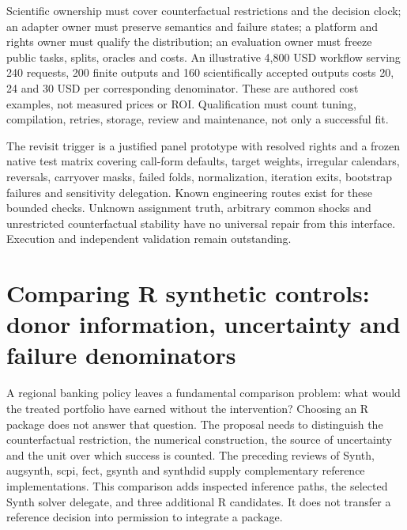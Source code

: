 Scientific ownership must cover counterfactual restrictions and the
decision clock; an adapter owner must preserve semantics and failure
states; a platform and rights owner must qualify the distribution; an
evaluation owner must freeze public tasks, splits, oracles and costs.
An illustrative 4,800 USD workflow serving 240 requests, 200 finite
outputs and 160 scientifically accepted outputs costs 20, 24 and 30 USD
per corresponding denominator. These are authored cost examples, not
measured prices or ROI. Qualification must count tuning, compilation,
retries, storage, review and maintenance, not only a successful fit.
\citep{exec24_fect_choice}

The revisit trigger is a justified panel prototype with resolved rights
and a frozen native test matrix covering call-form defaults, target
weights, irregular calendars, reversals, carryover masks, failed folds,
normalization, iteration exits, bootstrap failures and sensitivity
delegation. Known engineering routes exist for these bounded checks.
Unknown assignment truth, arbitrary common shocks and unrestricted
counterfactual stability have no universal repair from this interface.
Execution and independent validation remain outstanding.
\citep{exec24_fect_choice}


\section{Comparing R synthetic controls: donor information, uncertainty and failure denominators}
\label{sec:exec25-synthetic-r-coverage}

A regional banking policy leaves a fundamental comparison problem: what would
the treated portfolio have earned without the intervention? Choosing an R
package does not answer that question. The proposal needs to distinguish the
counterfactual restriction, the numerical construction, the source of
uncertainty and the unit over which success is counted. The preceding reviews
of Synth, augsynth, scpi, fect, gsynth and synthdid supply complementary
reference implementations. This comparison adds inspected inference paths,
the selected Synth solver delegate, and three additional R candidates. It
does not transfer a reference decision into permission to integrate a package.
\citep{exec24_synth_source,exec24_augsynth_source,exec24_scpi_source,
exec24_fect_source,exec21_gsynth_wrapper,exec23_synthdid_reuse_source,
exec25_synthr_choice}


